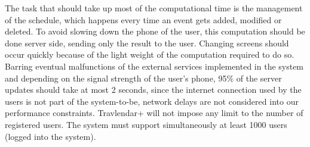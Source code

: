 The task that should take up most of the computational time is the management of the schedule, which happens every time an event gets added, modified or deleted. To avoid slowing down the phone of the user, this computation should be done server side, sending only the result to the user.
\newline
Changing screens should occur quickly because of the light weight of the computation required to do so.
\newline
Barring eventual malfunctions of the external services implemented in the system and depending on the signal strength of the user's phone, 95\% of the server updates should take at most 2 seconds, since the internet connection used by the users is not part of the system-to-be, network delays are not considered into our performance constraints.
Travlendar+ will not impose any limit to the number of registered users.
The system must support simultaneously at least 1000 users (logged into the system).